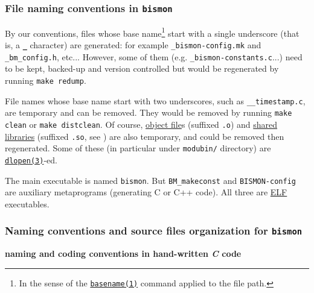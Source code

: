 \subsubsection{File naming conventions in \texttt{bismon}}

By our conventions, files  
whose base name\footnote{In the sense of the
\href{https://man7.org/linux/man-pages/man1/basename.1.html}{\texttt{basename(1)}}
command applied to the file path.} start with a single underscore
(that is, a \textbf{\texttt{\_}} character) are generated: for example
\texttt{\_bismon-config.mk} and \texttt{\_bm\_config.h},
etc... However, some of them (e.g. \texttt{\_bismon-constants.c}...)
need to be kept, backed-up and version controlled but would be
regenerated by running
 
\texttt{make redump}.

File names whose base name start with two underscores, such as
\texttt{\_\_timestamp.c}, are temporary and can be removed. They would
be removed by running \texttt{make clean} or \texttt{make
  distclean}.
 Of course,
\href{https://en.wikipedia.org/wiki/Object_file}{object file}s
(suffixed \texttt{.o}) and
\href{https://en.wikipedia.org/wiki/Library_(computing)#Shared_libraries}{shared
  libraries} (suffixed \texttt{.so}, see
\cite{Drepper:2011:sharedlib}) are also temporary, and could be
removed then regenerated. Some of these (in particular under
\texttt{modubin/} directory) are
\href{https://man7.org/linux/man-pages/man3/dlopen.3.html}{\texttt{dlopen(3)}}-ed.

The main executable is named \texttt{bismon}. But
\texttt{BM\_makeconst} and \texttt{BISMON-config} are auxiliary
metaprograms (generating C or C++ code). All three are
\href{https://en.wikipedia.org/wiki/Executable_and_Linkable_Format}{ELF}
executables.

\medskip

\subsubsection{Naming conventions and source files organization for \texttt{bismon}}

\medskip

{\large \textbf{naming and coding conventions in hand-written \emph{C} code}}

